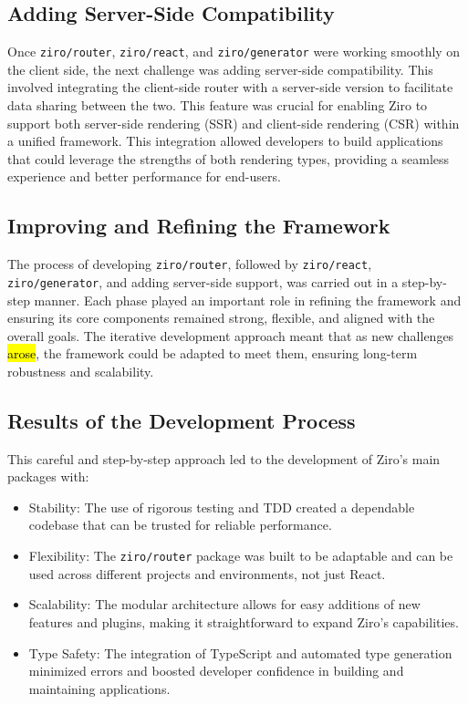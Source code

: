 \subsection{Adding Server-Side Compatibility}
Once \texttt{ziro/router}, \texttt{ziro/react}, and \texttt{ziro/generator} were working smoothly on the client side, the next challenge was adding server-side compatibility. This involved integrating the client-side router with a server-side version to facilitate data sharing between the two. This feature was crucial for enabling Ziro to support both server-side rendering (SSR) and client-side rendering (CSR) within a unified framework. This integration allowed developers to build applications that could leverage the strengths of both rendering types, providing a seamless experience and better performance for end-users.


\subsection{Improving and Refining the Framework}

The process of developing \texttt{ziro/router}, followed by \texttt{ziro/react}, \texttt{ziro/generator}, and adding server-side support, was carried out in a step-by-step manner. Each phase played an important role in refining the framework and ensuring its core components remained strong, flexible, and aligned with the overall goals. The iterative development approach meant that as new challenges \hl{arose}, the framework could be adapted to meet them, ensuring long-term robustness and scalability.


\subsection{Results of the Development Process}
This careful and step-by-step approach led to the development of Ziro’s main packages with:
\begin{itemize}
	\item Stability: The use of rigorous testing and TDD created a dependable codebase that can be trusted for reliable performance.

	\item Flexibility: The \texttt{ziro/router} package was built to be adaptable and can be used across different projects and environments, not just React.

	\item Scalability: The modular architecture allows for easy additions of new features and plugins, making it straightforward to expand Ziro’s capabilities.

	\item Type Safety: The integration of TypeScript and automated type generation minimized errors and boosted developer confidence in building and maintaining applications.
\end{itemize}

\pagebreak

